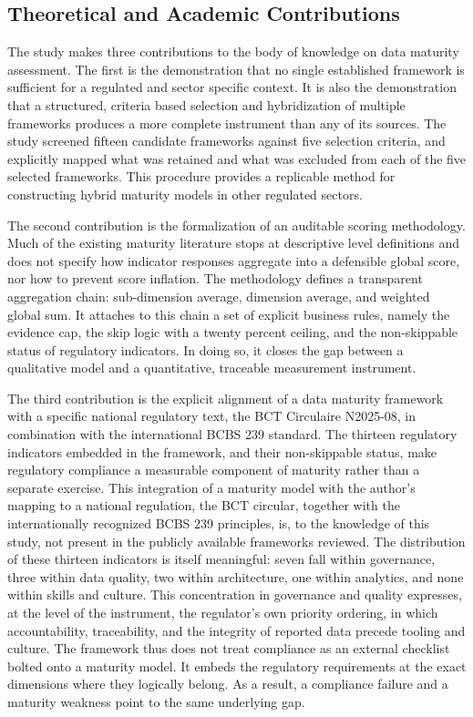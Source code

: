 \subsection{Theoretical and Academic Contributions}

The study makes three contributions to the body of knowledge on data maturity assessment. The first is the demonstration that no single established framework is sufficient for a regulated and sector specific context. It is also the demonstration that a structured, criteria based selection and hybridization of multiple frameworks produces a more complete instrument than any of its sources. The study screened fifteen candidate frameworks against five selection criteria, and explicitly mapped what was retained and what was excluded from each of the five selected frameworks. This procedure provides a replicable method for constructing hybrid maturity models in other regulated sectors.

The second contribution is the formalization of an auditable scoring methodology. Much of the existing maturity literature stops at descriptive level definitions and does not specify how indicator responses aggregate into a defensible global score, nor how to prevent score inflation. The methodology defines a transparent aggregation chain: sub-dimension average, dimension average, and weighted global sum. It attaches to this chain a set of explicit business rules, namely the evidence cap, the skip logic with a twenty percent ceiling, and the non-skippable status of regulatory indicators. In doing so, it closes the gap between a qualitative model and a quantitative, traceable measurement instrument.

The third contribution is the explicit alignment of a data maturity framework with a specific national regulatory text, the BCT Circulaire N\textdegree{}2025-08, in combination with the international BCBS 239 standard. The thirteen regulatory indicators embedded in the framework, and their non-skippable status, make regulatory compliance a measurable component of maturity rather than a separate exercise. This integration of a maturity model with the author's mapping to a national regulation, the BCT circular, together with the internationally recognized BCBS 239 principles, is, to the knowledge of this study, not present in the publicly available frameworks reviewed. The distribution of these thirteen indicators is itself meaningful: seven fall within governance, three within data quality, two within architecture, one within analytics, and none within skills and culture. This concentration in governance and quality expresses, at the level of the instrument, the regulator's own priority ordering, in which accountability, traceability, and the integrity of reported data precede tooling and culture. The framework thus does not treat compliance as an external checklist bolted onto a maturity model. It embeds the regulatory requirements at the exact dimensions where they logically belong. As a result, a compliance failure and a maturity weakness point to the same underlying gap.

